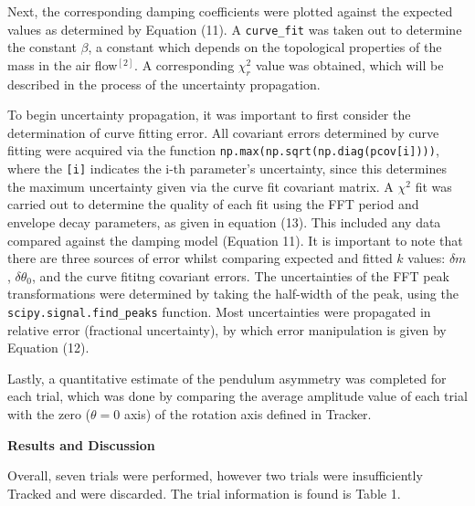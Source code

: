 \documentclass[11pt]{article}
\begin{document}
\begin{multicols}{2}
    Next, the corresponding damping coefficients were plotted against the expected values as determined by Equation (11). A \verb!curve_fit! was taken out to determine the constant $\beta$, a constant which depends on the topological properties of the mass in the air flow$^{[2]}$. A corresponding $\chi^2_r$ value was obtained, which will be described in the process of the uncertainty propagation.
    
    To begin uncertainty propagation, it was important to first consider the determination of curve fitting error. All covariant errors determined by curve fitting were acquired via the function \verb!np.max(np.sqrt(np.diag(pcov[i])))!, where the \verb![i]! indicates the i-th parameter's uncertainty, since this determines the maximum uncertainty given via the curve fit covariant matrix. A $\chi^2$ fit was carried out to determine the quality of each fit using the FFT period and envelope decay parameters, as given in equation (13). This included any data compared against the damping model (Equation 11). It is important to note that there are three sources of error whilst comparing expected and fitted $k$ values: $\delta m$, $\delta \theta_0$, and the curve fititng covariant errors. The uncertainties of the FFT peak transformations were determined by taking the half-width of the peak, using the \verb!scipy.signal.find_peaks! function. Most uncertainties were propagated in relative error (fractional uncertainty), by which error manipulation is given by Equation (12).
    
    Lastly, a quantitative estimate of the pendulum asymmetry was completed for each trial, which was done by comparing the average amplitude value of each trial with the zero ($\theta = 0$ axis) of the rotation axis defined in Tracker. 
    
    



    \vspace{10pt}

     \selectfont \textbf{Results and Discussion}
    
     \selectfont Overall, seven trials were performed, however two trials were insufficiently Tracked and were discarded. The trial information is found is Table 1.


\end{multicols}
\end{document}
